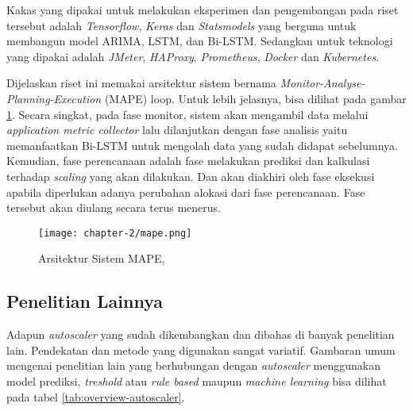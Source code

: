 Kakas yang dipakai untuk melakukan eksperimen dan pengembangan pada riset tersebut adalah \textit{Tensorflow}, \textit{Keras} dan \textit{Statsmodels} yang berguna untuk membangun model ARIMA, LSTM, dan Bi-LSTM. Sedangkan untuk teknologi yang dipakai adalah \textit{JMeter}, \textit{HAProxy}, \textit{Prometheus}, \textit{Docker} dan \textit{Kubernetes}.

Dijelaskan riset ini memakai arsitektur sistem bernama \textit{Monitor-Analyse-Planning-Execution} (MAPE) loop. Untuk lebih jelasnya, bisa dilihat pada gambar \ref{fig:mape}. Secara singkat, pada fase monitor, sistem akan mengambil data melalui \textit{application metric collector} lalu dilanjutkan dengan fase analisis yaitu memanfaatkan Bi-LSTM untuk mengolah data yang sudah didapat sebelumnya. Kemudian, fase perencanaan adalah fase melakukan prediksi dan kalkulasi terhadap \textit{scaling} yang akan dilakukan. Dan akan diakhiri oleh fase eksekusi apabila diperlukan adanya perubahan alokasi dari fase perencanaan. Fase tersebut akan diulang secara terus menerus.

\begin{figure}[h]
    \centering
    \texttt{[image: chapter-2/mape.png]}
    \caption{Arsitektur Sistem MAPE, \parencite{riset1}}
    \label{fig:mape}
\end{figure}

\subsection{Penelitian Lainnya}

Adapun \textit{autoscaler} yang sudah dikembangkan dan dibahas di banyak penelitian lain. Pendekatan dan metode yang digunakan sangat variatif. Gambaran umum mengenai penelitian lain yang berhubungan dengan \textit{autoscaler} menggunakan model prediksi, \textit{treshold} atau \textit{rule based} maupun \textit{machine learning} bisa dilihat pada tabel \ref{tab:overview-autoscaler}.

